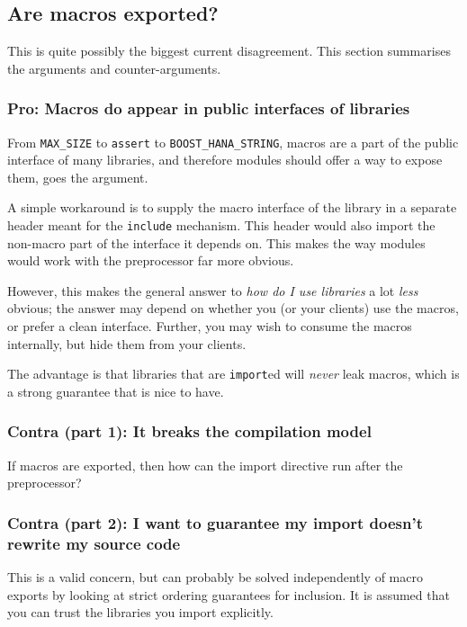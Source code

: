 \documentclass[reqno]{article}
\begin{document}
\subsection{Are macros exported?}

This is quite possibly the biggest current disagreement. This section summarises
the arguments and counter-arguments.


\subsubsection{Pro: Macros do appear in public interfaces of libraries}

From \texttt{MAX\_SIZE} to \texttt{assert} to \texttt{BOOST\_HANA\_STRING},
macros are a part of the public interface of many libraries, and therefore
modules should offer a way to expose them, goes the argument.

A simple workaround is to supply the macro interface of the library in a
separate header meant for the \texttt{include} mechanism. This header would
also import the non-macro part of the interface it depends on. This makes the
way modules would work with the preprocessor far more obvious.

However, this makes the general answer to \emph{how do I use libraries} a lot
\emph{less} obvious; the answer may depend on whether you (or your clients) use
the macros, or prefer a clean interface. Further, you may wish to consume the
macros internally, but hide them from your clients. 

The advantage is that libraries that are \texttt{import}ed will \emph{never}
leak macros, which is a strong guarantee that is nice to have.

\subsubsection{Contra (part 1): It breaks the compilation model}

If macros are exported, then how can the import directive run after the
preprocessor?


\subsubsection{Contra (part 2): I want to guarantee my import doesn't rewrite my source code}

This is a valid concern, but can probably be solved independently of macro
exports by looking at strict ordering guarantees for inclusion. It is assumed
that you can trust the libraries you import explicitly.
\end{document}
